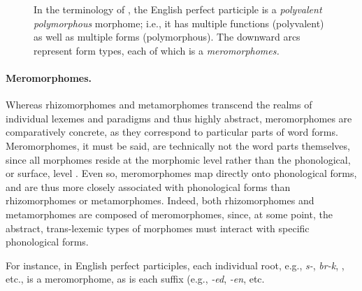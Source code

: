 {\begin{figure}[ht]
\centering
\label{fig:ppgraph}
\caption{In the terminology of \citet{aronoff:1994}, the English perfect participle  is a \emph{polyvalent polymorphous} morphome; i.e., it has multiple functions (polyvalent) as well as multiple forms (polymorphous). The downward arcs represent form types, each of which is a \emph{meromorphomes.}}
\end{figure}

\paragraph{Meromorphomes.} Whereas rhizomorphomes and metamorphomes 
transcend the realms of individual lexemes and paradigms and thus highly 
abstract, meromorphomes are comparatively concrete, as they 
correspond to particular parts of word forms. Meromorphomes, it must be said, 
are technically not the word parts themselves, since all morphomes reside at the 
morphomic level rather than the phonological, or surface, level \citep{round:2011}. 
Even so, meromorphomes map directly onto phonological forms, and 
are thus more closely associated with phonological forms than rhizomorphomes 
or metamorphomes. Indeed, both rhizomorphomes and metamorphomes are 
composed of meromorphomes, since, at some point, the abstract, trans-lexemic 
types of morphomes must interact with specific phonological forms. 

For instance, in English perfect participles, each individual root, e.g., \textit{s-}, 
\textit{br-k}, \textit{}, etc., is a meromorphome, as is each suffix (e.g., \textit{-ed}, \textit{-en}, etc.}

